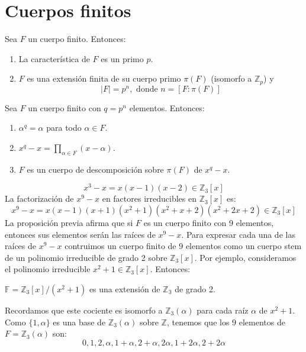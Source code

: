 \chapter{Cuerpos finitos}

\begin{proposition}
    Sea $F$ un cuerpo finito. Entonces:
    \begin{enumerate}
        \item La característica de $F$ es un primo $p$.
        \item $F$ es una extensión finita de su cuerpo primo $\pi(F)$ (isomorfo a $\mathbb{Z}_p$) y $$|F| = p^n, \text{ donde } n = [F : \pi(F)]$$
    \end{enumerate}
\end{proposition}

\begin{proposition}
    Sea $F$ un cuerpo finito con $q = p^n$ elementos. Entonces:
    \begin{enumerate}
        \item $\alpha^q = \alpha$ para todo $\alpha \in F$.
        \item $x^q - x = \prod_{\alpha \in F} (x-\alpha)$.
        \item $F$ es un cuerpo de descomposición sobre $\pi(F)$ de $x^q - x$.
    \end{enumerate}
\end{proposition}

\begin{example}
    $$x^3-x = x(x-1)(x-2) \in \mathbb{Z}_3[x]$$
    La factorización de $x^9-x$ en factores irreducibles en $\mathbb{Z}_3[x]$ es:
    $$x^9-x = x(x-1)(x+1)(x^2+1)(x^2+x+2)(x^2+2x+2) \in \mathbb{Z}_3[x]$$
    La proposición previa afirma que si $F$ es un cuerpo finito con 9 elementos, entonces sus elementos serán las raíces de $x^9-x$.
    Para expresar  cada una de las raíces de $x^9-x$ contruimos un cuerpo finito de 9 elementos como un cuerpo stem de un polinomio irreducible de grado 2 sobre $\mathbb{Z}_3[x]$.
    Por ejemplo, consideramos el polinomio irreducible $x^2+1 \in \mathbb{Z}_3[x]$. Entonces:
    \begin{center}
        $\mathbb{F} = \mathbb{Z}_3[x]/(x^2+1)$ es una extensión de $\mathbb{Z_3}$ de grado 2.
    \end{center}
    Recordamos que este cociente es isomorfo a $\mathbb{Z}_3(\alpha)$ para cada raíz $\alpha$ de $x^2+1$.
    Como $\{ 1, \alpha \}$ es una base de $\mathbb{Z}_3(\alpha)$ sobre $\mathbb{Z}$, tenemos que los 9 elementos de $F = \mathbb{Z}_3(\alpha)$ son:
    $$0, 1, 2, \alpha, 1+\alpha, 2+\alpha, 2\alpha, 1+2\alpha, 2+2\alpha$$
\end{example}

